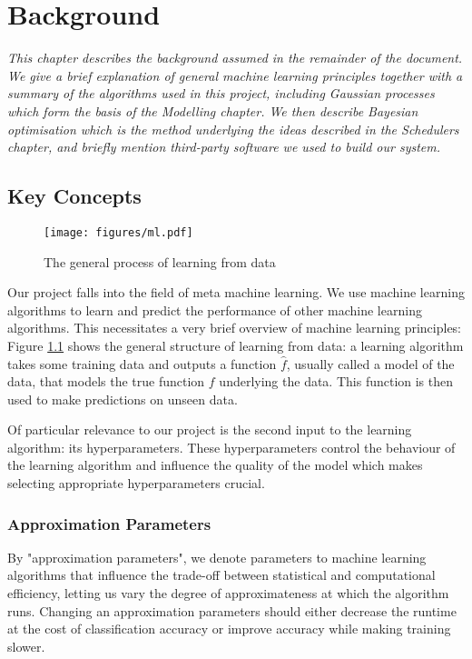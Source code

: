 \documentclass[a4paper,12pt,twoside,openright]{report}
\begin{document}
\chapter{Background}
\textit{This chapter describes the background assumed in the remainder of the document. We give a brief explanation of general machine learning principles together with a summary of the algorithms used in this project, including Gaussian processes which form the basis of the Modelling chapter. We then describe Bayesian optimisation which is the method underlying the ideas described in the Schedulers chapter, and briefly mention third-party software we used to build our system.}


\section{Key Concepts}
\begin{figure}
\centering
  \texttt{[image: figures/ml.pdf]}
  \caption{The general process of learning from data}
  \label{mlstructure}
\end{figure}

Our project falls into the field of meta machine learning. We use machine learning algorithms to learn and predict the performance of other machine learning algorithms. This necessitates a very brief overview of machine learning principles: Figure \ref{mlstructure} shows the general structure of learning from data: a learning algorithm takes some training data and outputs a function $\hat{f}$, usually called a model of the data, that models the true function $f$ underlying the data. This function is then used to make predictions on unseen data.

Of particular relevance to our project is the second input to the learning algorithm: its hyperparameters. These hyperparameters control the behaviour of the learning algorithm and influence the quality of the model which makes selecting appropriate hyperparameters crucial.


\subsection{Approximation Parameters}
By "approximation parameters", we denote parameters to machine learning algorithms that influence the trade-off between statistical and computational efficiency, letting us vary the degree of approximateness at which the algorithm runs. Changing an approximation parameters should either decrease the runtime at the cost of classification accuracy or improve accuracy while making training slower. 
\end{document}
